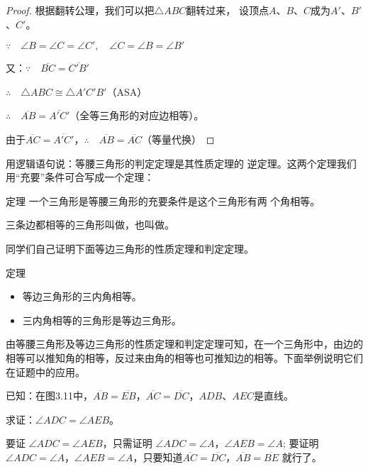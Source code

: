 \begin{proof}
    根据翻转公理，我们可以把$\triangle ABC$翻转过来，
    设顶点$A$、$B$、$C$成为$A'$、$B'$、$C'$。
    
    $\because\quad \angle B=\angle C=\angle C',\quad \angle C=\angle B=\angle B'$

    又：$\because\quad \overline{BC}=\overline{C'B'}$

    $\therefore\quad \triangle ABC\cong \triangle A'C'B'$（ASA）

    $\therefore\quad \overline{AB}=\overline{A'C'}$（全等三角形的对应边相等）。

由于$\overline{AC}=\overline{A'C'}$，$\therefore\quad \overline{AB}=\overline{AC}$（等量代换）
\end{proof}

用逻辑语句说：等腰三角形的判定定理是其性质定理的
逆定理。这两个定理我们用“充要”条件可合写成一个定理：

\begin{Theorem}{定理}
   一个三角形是等腰三角形的充要条件是这个三角形有两
个角相等。
\end{Theorem}

\begin{Definition}
三条边都相等的三角形叫做，也叫做。
\end{Definition}


同学们自己证明下面等边三角形的性质定理和判定定理。

\begin{Theorem}[等边三角形的性质定理和判定定理]{定理}
  \begin{itemize}
    \item 等边三角形的三内角相等。
    \item 三内角相等的三角形是等边三角形。
  \end{itemize}
\end{Theorem}

由等腰三角形及等边三角形的性质定理和判定定理可知，在一个三角形中，由边的相等可以推知角的相等，反过来由角的相等也可推知边的相等。下面举例说明它们在证题中的应用。

\begin{example}
已知：在图3.11中，$\overline{AB}=\overline{EB}$，$\overline{AC}=\overline{DC}$，$ADB$、$AEC$是直线。

求证：$\angle ADC=\angle AEB$。
\end{example}

\begin{analyze}
要证 $\angle ADC=\angle AEB$，只需证明 $\angle ADC=\angle A$，$\angle AEB=\angle A$; 要证明 $\angle ADC=\angle A$，$\angle AEB=\angle A$，只要知道$\overline{AC}=\overline{DC}$，$\overline{AB}=\overline{BE}$ 就行了。
\end{analyze}

